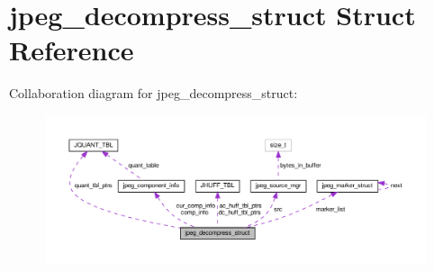 \hypertarget{structjpeg__decompress__struct}{}\section{jpeg\+\_\+decompress\+\_\+struct Struct Reference}
\label{structjpeg__decompress__struct}


Collaboration diagram for jpeg\+\_\+decompress\+\_\+struct\+:
\nopagebreak
\begin{figure}[H]
\begin{center}
\leavevmode
\includegraphics[width=350pt]{structjpeg__decompress__struct__coll__graph}
\end{center}
\end{figure}
